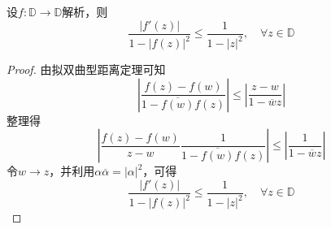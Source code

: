 \begin{theorem}

    设$f: \mathbb{D} \to \mathbb{D}$解析，则
    \[\dfrac{|f'(z)|}{1 - |f(z)|^2} \leq \dfrac{1}{1 - |z|^2}, \quad \forall z \in \mathbb{D}\]

\end{theorem}

\begin{proof}
    
    由拟双曲型距离定理可知
    \[\left| \dfrac{f(z) - f(w)}{1 - \overline{f(w)}f(z)} \right| \leq \left| \dfrac{z - w}{1 - \overline{w}z} \right|\]
    整理得
    \[\left| \dfrac{f(z) - f(w)}{z - w} \dfrac{1}{1 - \overline{f(w)}f(z)} \right| \leq \left| \dfrac{1}{1 - \overline{w}z} \right|\]
    令$w \to z$，并利用$\alpha \overline{\alpha} = | \alpha|^2$，可得
    \[\dfrac{|f'(z)|}{1 - |f(z)|^2} \leq \dfrac{1}{1 - |z|^2}, \quad \forall z \in \mathbb{D}\]
    
\end{proof}
